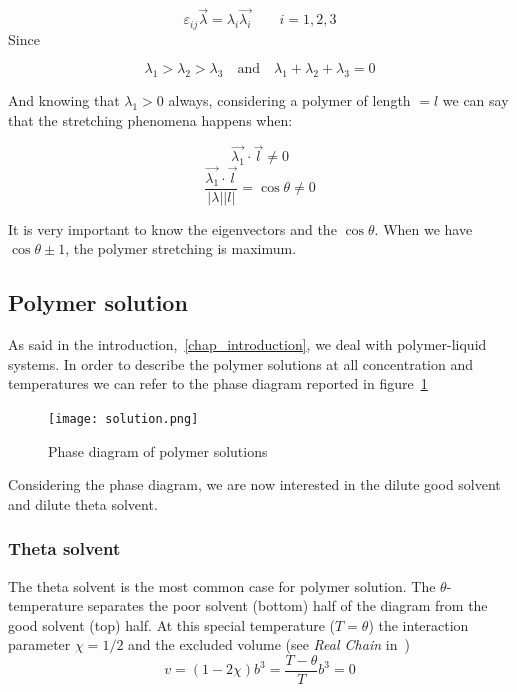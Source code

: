 \begin{equation}
\varepsilon_{ij} \vec{\lambda} = \lambda_i \vec{\lambda_i} \qquad  i=1,2,3
\end{equation}
Since 

\[
\lambda_1 > \lambda_2 > \lambda_3 \quad \text{and} \quad \lambda_1 + \lambda_2 + \lambda_3 = 0
\]

And knowing that $\lambda_1 > 0 $ always, considering a polymer of length $= l$ we can say that the stretching phenomena happens when: %

\begin{equation}
\vec{\lambda_1} \cdot \vec{l} \neq 0         
\end{equation}
\begin{equation}
\frac{\vec{\lambda_1} \cdot \vec{l}}{|\lambda||l|} = \cos\theta \neq 0 
\end{equation}

It is very important to know the eigenvectors and the $\cos\theta$. When we have
$\cos\theta \pm 1 $, the polymer stretching is maximum.





\subsection{Polymer solution}

As said in the introduction,~\ref{chap_introduction}, we deal with polymer-liquid systems.
In order to describe the polymer solutions at all concentration and temperatures we can refer to the phase diagram reported in figure~\ref{fig:sol} 

\begin{figure}[h]
\centering 
\texttt{[image: solution.png]}
\caption{Phase diagram of polymer solutions}
\label{fig:sol}
\end{figure}

Considering the phase diagram, we are now interested in the dilute good solvent and dilute theta solvent.

\subsubsection{Theta solvent}
The theta solvent is the most common case for polymer solution. The $\theta$-temperature separates the poor solvent (bottom) half of the diagram from the good solvent (top) half. At this special temperature ($T=\theta$) the interaction parameter $\chi = 1/2$ and the excluded volume (see \textit{Real Chain} in~\cite{pp})
\begin{equation}
v = (1-2\chi) b^3 = \frac{T-\theta}{T}b^3 = 0
\label{eq:exvol}
\end{equation}

